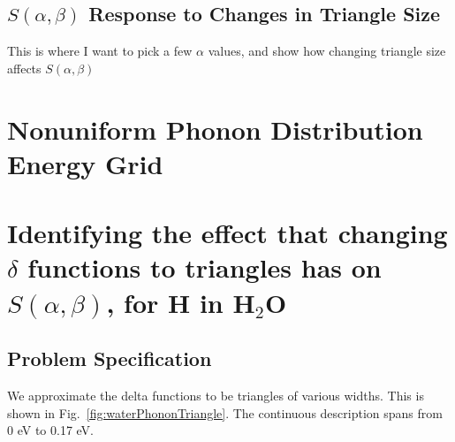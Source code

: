 \documentclass[Master.tex]{subfiles}
\begin{document}
  








              \clearpage

		\subsection{$S(\alpha,\beta)$ Response to Changes in Triangle Size} 
			This is where I want to pick a few $\alpha$ values, and show how changing triangle size affects $S(\alpha,\beta)$

                        \clearpage
	\section{Nonuniform Phonon Distribution Energy Grid}


\section*{Identifying the effect that changing $\delta$ functions to triangles has on $S(\alpha,\beta)$, for H in H$_2$O}

  \subsection*{Problem Specification}
  We approximate the delta functions to be triangles of various widths. This is shown in Fig.~\ref{fig:waterPhononTriangle}. The continuous description spans from 0 eV to 0.17 eV.
\end{document}
